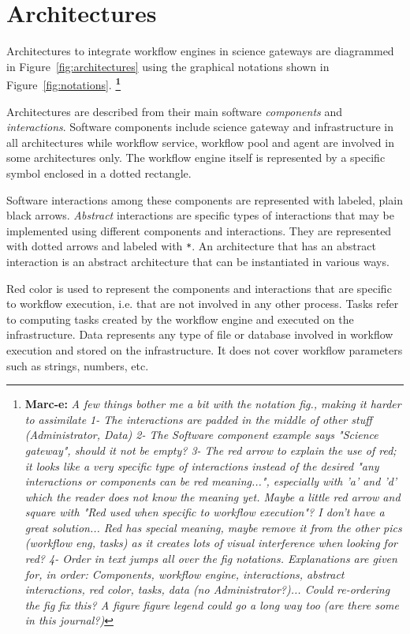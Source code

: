 \documentclass[preprint,3p,twocolumn]{elsarticle}
\newcommand{\note}[2]{\textbf{\Large{\color{blue}\footnote{{\color{blue}\textbf{#1:} \textit{#2}\color{black}}}}}}
\begin{document}
\section{Architectures}
\label{sec:architectures}

Architectures to integrate workflow engines in science gateways are
diagrammed in Figure~\ref{fig:architectures} using the graphical
notations shown in Figure~\ref{fig:notations}.
\note{Marc-e}{A few things bother me a bit with the notation fig., making it harder to assimilate
1- The interactions are padded in the middle of other stuff (Administrator, Data)
2- The Software component example says "Science gateway", should it not be empty?
3- The red arrow to explain the use of red; it looks like a very specific type
of interactions instead of the desired "any interactions or components can be red meaning...",
especially with 'a' and 'd' which the reader does not know the meaning yet.
Maybe a little red arrow and square with "Red used when specific to workflow execution"?
I don't have a great solution...
Red has special meaning, maybe remove it from the other pics (workflow eng, tasks)
as it creates lots of visual interference when looking for red?
4- Order in text jumps all over the fig notations. Explanations are given for, in order:
Components, workflow engine, interactions, abstract interactions, red color, tasks, data (no Administrator?)...
Could re-ordering the fig fix this? A figure figure legend could go a long way too (are there some in this journal?)
}

Architectures are described from their main software \emph{components}
and \emph{interactions}. Software components include science gateway
and infrastructure in all architectures while workflow service,
workflow pool and agent are involved in some architectures only. The
workflow engine itself is represented by a specific symbol enclosed in a dotted rectangle.

Software interactions among these components are represented with
labeled, plain black arrows.  \emph{Abstract} interactions are
specific types of interactions that may be implemented using different
components and interactions. They are represented with dotted arrows
and labeled with \texttt{*}. An architecture that has an abstract
interaction is an abstract architecture that can be instantiated in
various ways.

Red color is used to represent the components and interactions that
are specific to workflow execution, i.e. that are not involved in any
other process. Tasks refer to computing tasks created by the workflow
engine and executed on the infrastructure. Data represents any type of
file or database involved in workflow execution and stored on the
infrastructure. It does not cover workflow parameters such as strings,
numbers, etc.
\end{document}
